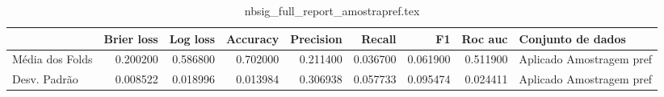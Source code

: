 \begin{table}
\centering
\caption{nbsig_full_report_amostrapref.tex}
\label{nbsig_full_report_amostrapref.tex}
\begin{tabular}{lrrrrrrrl}
\toprule
{}               &  Brier  loss &  Log loss &  Accuracy  &  Precision  &   Recall  &       F1  &  Roc auc  &         Conjunto de dados \\
\midrule
Média dos Folds &     0.200200 &  0.586800 &   0.702000 &    0.211400 &  0.036700 &  0.061900 &  0.511900 &  Aplicado Amostragem pref \\
Desv. Padrão    &     0.008522 &  0.018996 &   0.013984 &    0.306938 &  0.057733 &  0.095474 &  0.024411 &  Aplicado Amostragem pref \\
\bottomrule
\end{tabular}
\end{table}
